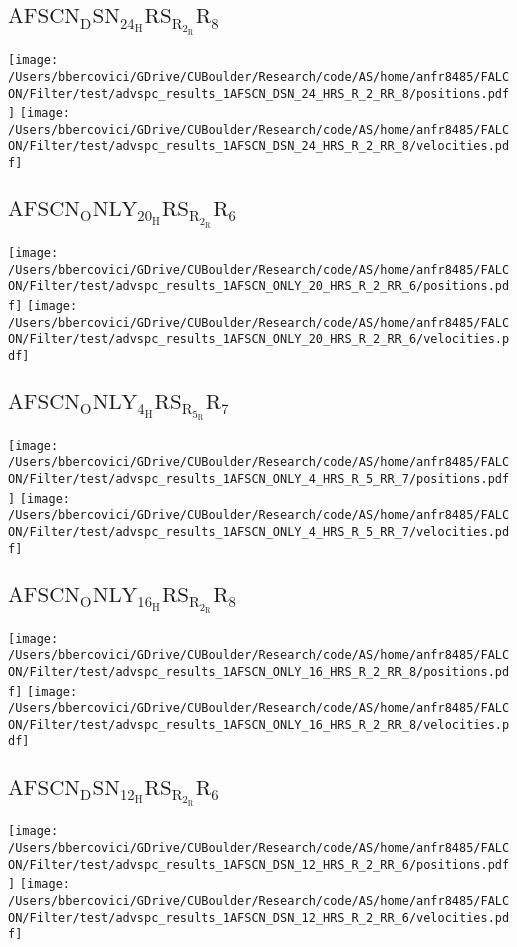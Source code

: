 \subsection{$\mathrm{AFSCN_DSN_24_HRS_R_2_RR_8}$}
\texttt{[image: /Users/bbercovici/GDrive/CUBoulder/Research/code/AS/home/anfr8485/FALCON/Filter/test/advspc\_results\_1AFSCN\_DSN\_24\_HRS\_R\_2\_RR\_8/positions.pdf]}
\texttt{[image: /Users/bbercovici/GDrive/CUBoulder/Research/code/AS/home/anfr8485/FALCON/Filter/test/advspc\_results\_1AFSCN\_DSN\_24\_HRS\_R\_2\_RR\_8/velocities.pdf]}
\subsection{$\mathrm{AFSCN_ONLY_20_HRS_R_2_RR_6}$}
\texttt{[image: /Users/bbercovici/GDrive/CUBoulder/Research/code/AS/home/anfr8485/FALCON/Filter/test/advspc\_results\_1AFSCN\_ONLY\_20\_HRS\_R\_2\_RR\_6/positions.pdf]}
\texttt{[image: /Users/bbercovici/GDrive/CUBoulder/Research/code/AS/home/anfr8485/FALCON/Filter/test/advspc\_results\_1AFSCN\_ONLY\_20\_HRS\_R\_2\_RR\_6/velocities.pdf]}
\subsection{$\mathrm{AFSCN_ONLY_4_HRS_R_5_RR_7}$}
\texttt{[image: /Users/bbercovici/GDrive/CUBoulder/Research/code/AS/home/anfr8485/FALCON/Filter/test/advspc\_results\_1AFSCN\_ONLY\_4\_HRS\_R\_5\_RR\_7/positions.pdf]}
\texttt{[image: /Users/bbercovici/GDrive/CUBoulder/Research/code/AS/home/anfr8485/FALCON/Filter/test/advspc\_results\_1AFSCN\_ONLY\_4\_HRS\_R\_5\_RR\_7/velocities.pdf]}
\subsection{$\mathrm{AFSCN_ONLY_16_HRS_R_2_RR_8}$}
\texttt{[image: /Users/bbercovici/GDrive/CUBoulder/Research/code/AS/home/anfr8485/FALCON/Filter/test/advspc\_results\_1AFSCN\_ONLY\_16\_HRS\_R\_2\_RR\_8/positions.pdf]}
\texttt{[image: /Users/bbercovici/GDrive/CUBoulder/Research/code/AS/home/anfr8485/FALCON/Filter/test/advspc\_results\_1AFSCN\_ONLY\_16\_HRS\_R\_2\_RR\_8/velocities.pdf]}
\subsection{$\mathrm{AFSCN_DSN_12_HRS_R_2_RR_6}$}
\texttt{[image: /Users/bbercovici/GDrive/CUBoulder/Research/code/AS/home/anfr8485/FALCON/Filter/test/advspc\_results\_1AFSCN\_DSN\_12\_HRS\_R\_2\_RR\_6/positions.pdf]}
\texttt{[image: /Users/bbercovici/GDrive/CUBoulder/Research/code/AS/home/anfr8485/FALCON/Filter/test/advspc\_results\_1AFSCN\_DSN\_12\_HRS\_R\_2\_RR\_6/velocities.pdf]}
